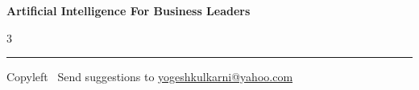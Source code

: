 \documentclass[8pt,landscape]{article}
\begin{document}
\footnotesize


\begin{center}
\Large{\textbf{Artificial Intelligence For Business Leaders}} %
\end{center}

\begin{multicols}{3}

\end{multicols}

\rule{\linewidth}{0.25pt}
\scriptsize
Copyleft \textcopyleft\  Send suggestions to 
\href{http://yati.io}{yogeshkulkarni@yahoo.com}
\end{document}
